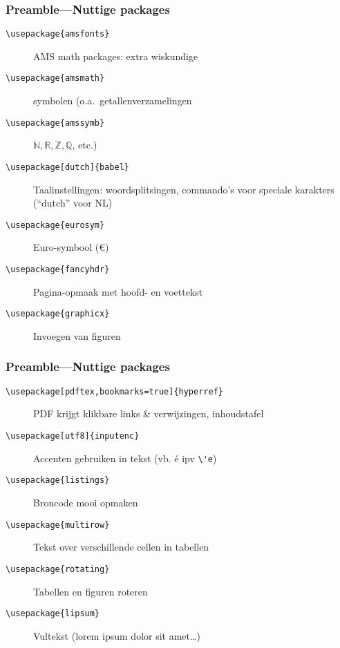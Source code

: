 \documentclass[aspectratio=169]{beamer}
\begin{document}
\begin{frame}[fragile]
  \frametitle{Preamble---Nuttige packages}

  \begin{description}
    \item[\texttt{\textbackslash{}usepackage\{amsfonts\}}] AMS math packages: extra wiskundige
    \item[\texttt{\textbackslash{}usepackage\{amsmath\}}] symbolen (o.a.\ getallenverzamelingen
    \item[\texttt{\textbackslash{}usepackage\{amssymb\}}] \(\mathbb{N}, \mathbb{R}, \mathbb{Z}, \mathbb{Q}\), etc.)
    \pause
    \item[\texttt{\textbackslash{}usepackage[dutch]\{babel\}}] Taalinstellingen: woordsplitsingen, commando's voor speciale karakters (``dutch'' voor NL)
    \pause
    \item[\texttt{\textbackslash{}usepackage\{eurosym\}}] Euro-symbool (\euro)
    \pause
    \item[\texttt{\textbackslash{}usepackage\{fancyhdr\}}] Pagina-opmaak met hoofd- en voettekst
    \pause
    \item[\texttt{\textbackslash{}usepackage\{graphicx\}}] Invoegen van figuren
  \end{description}
\end{frame}

\begin{frame}[fragile]
  \frametitle{Preamble---Nuttige packages}

  \begin{description}
    \item[\texttt{\textbackslash{}usepackage[pdftex,bookmarks=true]\{hyperref\}}] PDF krijgt klikbare links \& verwijzingen, inhoudstafel \pause
    \item[\texttt{\textbackslash{}usepackage[utf8]\{inputenc\}}] Accenten gebruiken in tekst (vb. é ipv \verb|\'e|) \pause
    \item[\texttt{\textbackslash{}usepackage\{listings\}}] Broncode mooi opmaken \pause
    \item[\texttt{\textbackslash{}usepackage\{multirow\}}] Tekst over verschillende cellen in tabellen \pause
    \item[\texttt{\textbackslash{}usepackage\{rotating\}}] Tabellen en figuren roteren \pause
    \item[\texttt{\textbackslash{}usepackage\{lipsum\}}] Vultekst (lorem ipsum dolor sit amet\ldots)
  \end{description}
\end{frame}
\end{document}
